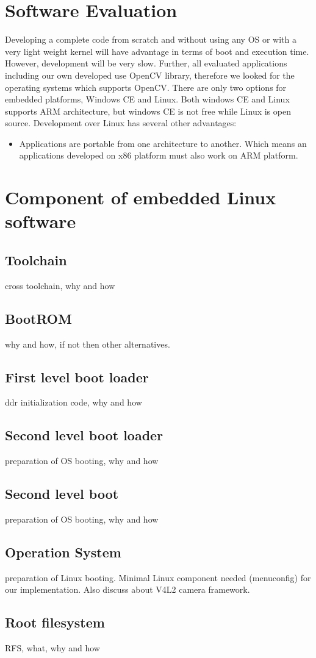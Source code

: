\section {Software Evaluation}
\indent Developing a complete code from scratch and without using any OS
or with a very light weight kernel will have advantage in terms of boot
and execution time. However, development will be very slow. Further,
all evaluated applications including our own developed use
OpenCV library, therefore we looked for the operating systems which
supports OpenCV. There are only two options for embedded platforms,
Windows CE and Linux. Both windows CE and Linux supports ARM
architecture, but windows CE is not free while Linux is open source.
Development over Linux has several other advantages:
\begin{itemize}
	\item Applications are portable from one architecture to
		another. Which means an applications developed on x86
		platform must also work on ARM platform.
\end{itemize}
\section {Component of embedded Linux software}
\subsection {Toolchain}
cross toolchain, why and how
\subsection {BootROM}
why and how, if not then other alternatives.
\subsection {First level boot loader}
ddr initialization code, why and how
\subsection {Second level boot loader}
preparation of OS booting, why and how
\subsection {Second level boot }
preparation of OS booting, why and how
\subsection {Operation System}
preparation of Linux booting. Minimal Linux component needed
(menuconfig) for our implementation. Also discuss about V4L2 camera
framework.
\subsection {Root filesystem}
RFS, what, why and how
